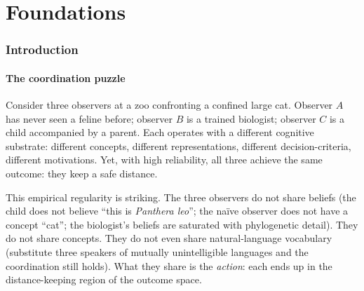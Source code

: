 \documentclass[11pt,a4paper]{article}
\begin{document}
\tableofcontents
\clearpage

\part{Foundations}

\section{Introduction}
\label{sec:intro}

\subsection{The coordination puzzle}

Consider three observers at a zoo confronting a confined large cat.
Observer $A$ has never seen a feline before; observer $B$ is a trained
biologist; observer $C$ is a child accompanied by a parent. Each operates
with a different cognitive substrate: different concepts, different
representations, different decision-criteria, different motivations.
Yet, with high reliability, all three achieve the same outcome: they
keep a safe distance.

This empirical regularity is striking. The three observers do not share
beliefs (the child does not believe ``this is \emph{Panthera leo}''; the
naïve observer does not have a concept ``cat''; the biologist's beliefs
are saturated with phylogenetic detail). They do not share concepts.
They do not even share natural-language vocabulary (substitute three
speakers of mutually unintelligible languages and the coordination still
holds). What they share is the \emph{action}: each ends up in the
distance-keeping region of the outcome space.
\end{document}
